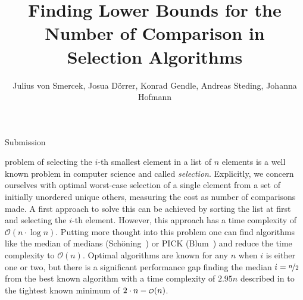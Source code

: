 \documentclass[10pt,journal,compsoc]{IEEEtran}
\newcommand\smallO{
  \mathchoice
    {{\scriptstyle\mathcal{O}}}%
    {{\scriptstyle\mathcal{O}}}%
    {{\scriptscriptstyle\mathcal{O}}}%
    {\scalebox{.50}{$\scriptscriptstyle\mathcal{O}$}}%
  }
\begin{document}
\title{Finding Lower Bounds for the Number of Comparison in Selection Algorithms}

\author{Julius von Smercek, Josua Dörrer, Konrad Gendle, Andreas Steding, Johanna Hofmann%
  }

%
{Submission}




\maketitle

\IEEEdisplaynontitleabstractindextext


\IEEEpeerreviewmaketitle

  problem of selecting the $i$-th smallest element in a list of $n$ elements is a well known problem in computer science and called \textit{selection}.
Explicitly, we concern ourselves with optimal worst-case selection of a single element from a set of initially unordered unique others, measuring the cost as number of comparisons made.
A first approach to solve this can be achieved by sorting the list at first and selecting the $i$-th element.
However, this approach has a time complexity of $\mathcal{O}(n \cdot \log n)$.
Putting more thought into this problem one can find algorithms like the median of medians (Schöning~\cite{Schoening1993}) or PICK (Blum~\cite{Blum1972}) and reduce the time complexity to $\mathcal{O}(n)$.
Optimal algorithms are known for any $n$ when $i$ is either one or two, but there is a significant performance gap finding the median $i = \nicefrac{n}{2}$ from the best known algorithm with a time complexity of $2.95n$ described in \cite{dor1999selecting} to the tightest known minimum of $2 \cdot n - \smallO(n)$.
\end{document}
